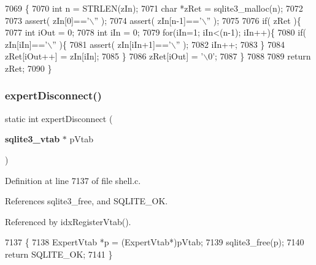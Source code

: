\begin{DoxyCode}
7069                                            \{
7070   \textcolor{keywordtype}{int} n = STRLEN(zIn);
7071   \textcolor{keywordtype}{char} *zRet = sqlite3_malloc(n);
7072 
7073   assert( zIn[0]==\textcolor{charliteral}{'\(\backslash\)''} );
7074   assert( zIn[n-1]==\textcolor{charliteral}{'\(\backslash\)''} );
7075 
7076   \textcolor{keywordflow}{if}( zRet )\{
7077     \textcolor{keywordtype}{int} iOut = 0;
7078     \textcolor{keywordtype}{int} iIn = 0;
7079     \textcolor{keywordflow}{for}(iIn=1; iIn<(n-1); iIn++)\{
7080       \textcolor{keywordflow}{if}( zIn[iIn]==\textcolor{charliteral}{'\(\backslash\)''} )\{
7081         assert( zIn[iIn+1]==\textcolor{charliteral}{'\(\backslash\)''} );
7082         iIn++;
7083       \}
7084       zRet[iOut++] = zIn[iIn];
7085     \}
7086     zRet[iOut] = \textcolor{charliteral}{'\(\backslash\)0'};
7087   \}
7088 
7089   \textcolor{keywordflow}{return} zRet;
7090 \}
\end{DoxyCode}
\mbox{\label{shell_8c_aaa7c792ff9f354b2d2e2b3a92201ec1e}} 
\subsubsection{expert\+Disconnect()}
{\footnotesize\ttfamily static int expert\+Disconnect (\begin{DoxyParamCaption}\item[{\textbf{ sqlite3\+\_\+vtab} $\ast$}]{p\+Vtab }\end{DoxyParamCaption})\hspace{0.3cm}{\ttfamily [static]}}



Definition at line 7137 of file shell.\+c.



References sqlite3\+\_\+free, and S\+Q\+L\+I\+T\+E\+\_\+\+OK.



Referenced by idx\+Register\+Vtab().


\begin{DoxyCode}
7137                                                 \{
7138   ExpertVtab *p = (ExpertVtab*)pVtab;
7139   sqlite3_free(p);
7140   \textcolor{keywordflow}{return} SQLITE_OK;
7141 \}
\end{DoxyCode}
\mbox{\label{shell_8c_a42ac27058e51135f2c677fe4ec766aeb}} 
